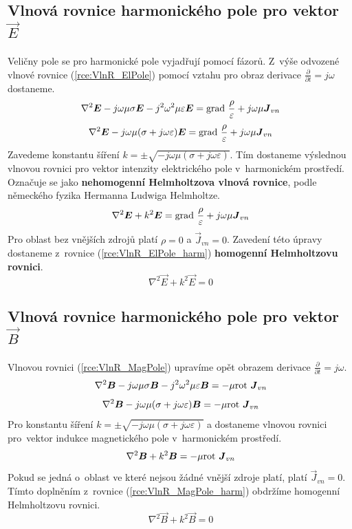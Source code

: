\subsection*{Vlnová rovnice harmonického pole pro vektor $\vec E$}
Veličny pole se pro harmonické pole vyjadřují pomocí fázorů. Z~výše odvozené vlnové rovnice (\ref{rce:VlnR_ElPole}) pomocí vztahu pro obraz derivace $\frac{\partial}{\partial t}=j\omega$ dostaneme.
\begin{displaymath}
	\nabla^{2}\mbox{\boldmath$E$} -j\omega\mu\sigma\mbox{\boldmath$E$}-j^{2}\omega ^{2}\mu\varepsilon\mbox{\boldmath$E$} = \mathrm{grad}\ \frac{\rho}{\varepsilon}+j\omega\mu\mbox{\boldmath$J$}_{vn}
\end{displaymath}
\begin{displaymath}
	\nabla^{2}\mbox{\boldmath$E$} -j\omega\mu(\sigma+j\omega\varepsilon)\mbox{\boldmath$E$} = \mathrm{grad}\ \frac{\rho}{\varepsilon}+ j\omega\mu\mbox{\boldmath$J$}_{vn}
\end{displaymath}
Zavedeme konstantu šíření $k=\pm\sqrt{-j\omega\mu(\sigma+j\omega\varepsilon)}$. Tím dostaneme výslednou  vlnovou rovnici pro vektor intenzity elektrického pole v~harmonickém prostředí. Označuje se jako {\bf nehomogenní Helmholtzova vlnová rovnice}, podle německého fyzika Hermanna Ludwiga Helmholtze.
\begin{equation}
	\nabla^{2}\mbox{\boldmath$E$} +k^{2}\mbox{\boldmath$E$} = \mathrm{grad}\ \frac{\rho}{\varepsilon}+ j\omega\mu\mbox{\boldmath$J$}_{vn}
	\label{rce:VlnR_ElPole_harm} 
\end{equation}
Pro oblast bez vnějších zdrojů platí $\rho = 0$ a $\vec J_{vn} = 0$. Zavedení této úpravy dostaneme z~rovnice (\ref{rce:VlnR_ElPole_harm}) {\bf homogenní Helmholtzovu rovnici}.
\begin{equation}
	\nabla^{2}\vec E +k^{2}\vec E = 0
	\label{rce:VlnR_ElPole_harm_BezZdroju} 
\end{equation}

\subsection*{Vlnová rovnice harmonického pole pro vektor $\vec B$}
Vlnovou rovnici (\ref{rce:VlnR_MagPole}) upravíme opět obrazem derivace $\frac{\partial}{\partial t}=j\omega$.
\begin{displaymath}
	\nabla^{2}\mbox{\boldmath$B$} - j\omega\mu\sigma\mbox{\boldmath$B$} - j^{2}\omega^{2}\mu\varepsilon\mbox{\boldmath$B$} = -\mu\mathrm{rot}\ \mbox{\boldmath$J$}_{vn}
\end{displaymath}
\begin{displaymath}
	\nabla^{2}\mbox{\boldmath$B$} - j\omega\mu(\sigma + j\omega\varepsilon)\mbox{\boldmath$B$} = -\mu\mathrm{rot}\ \mbox{\boldmath$J$}_{vn}
\end{displaymath}
Pro konstantu šíření $k=\pm\sqrt{-j\omega\mu(\sigma+j\omega\varepsilon)}$ a dostaneme vlnovou rovnici pro~vektor indukce magnetického pole v~harmonickém prostředí.
\begin{equation}
	\nabla^{2}\mbox{\boldmath$B$} +k^{2}\mbox{\boldmath$B$} = -\mu\mathrm{rot}\ \mbox{\boldmath$J$}_{vn}
	\label{rce:VlnR_MagPole_harm} 
\end{equation}
Pokud se jedná o~oblast ve které nejsou žádné vnější zdroje platí, platí $\vec J_{vn} = 0$. Tímto doplněním z~rovnice  (\ref{rce:VlnR_MagPole_harm}) obdržíme homogenní Helmholtzovu rovnici.
\begin{equation}
	\nabla^{2}\vec B +k^{2}\vec B = 0
	\label{rce:VlnR_MagPole_harm_BezZdroju} 
\end{equation}

